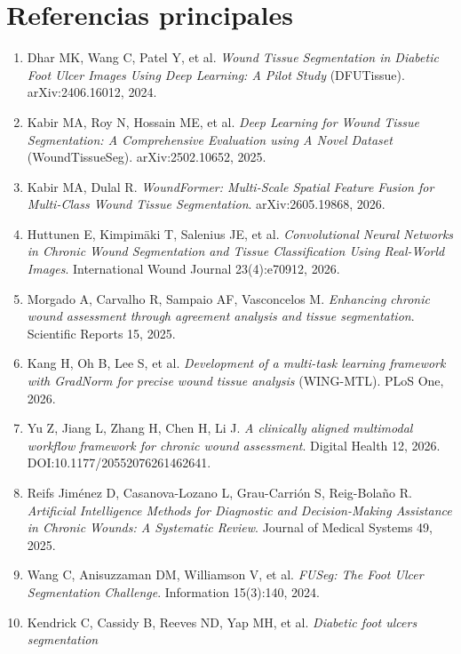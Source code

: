 \documentclass[12pt,letterpaper]{article}
\begin{document}
\section*{Referencias principales}
\small
\begin{enumerate}[leftmargin=1.4em]
  \item Dhar MK, Wang C, Patel Y, et al. \textit{Wound Tissue Segmentation in Diabetic Foot Ulcer
        Images Using Deep Learning: A Pilot Study} (DFUTissue). arXiv:2406.16012, 2024.
  \item Kabir MA, Roy N, Hossain ME, et al. \textit{Deep Learning for Wound Tissue Segmentation: A
        Comprehensive Evaluation using A Novel Dataset} (WoundTissueSeg). arXiv:2502.10652, 2025.
  \item Kabir MA, Dulal R. \textit{WoundFormer: Multi-Scale Spatial Feature Fusion for Multi-Class
        Wound Tissue Segmentation}. arXiv:2605.19868, 2026.
  \item Huttunen E, Kimpimäki T, Salenius JE, et al. \textit{Convolutional Neural Networks in Chronic
        Wound Segmentation and Tissue Classification Using Real-World Images}. International Wound
        Journal 23(4):e70912, 2026.
  \item Morgado A, Carvalho R, Sampaio AF, Vasconcelos M. \textit{Enhancing chronic wound assessment
        through agreement analysis and tissue segmentation}. Scientific Reports 15, 2025.
  \item Kang H, Oh B, Lee S, et al. \textit{Development of a multi-task learning framework with
        GradNorm for precise wound tissue analysis} (WING-MTL). PLoS One, 2026.
  \item Yu Z, Jiang L, Zhang H, Chen H, Li J. \textit{A clinically aligned multimodal workflow
        framework for chronic wound assessment}. Digital Health 12, 2026.
        DOI:10.1177/20552076261462641.
  \item Reifs Jiménez D, Casanova-Lozano L, Grau-Carrión S, Reig-Bolaño R. \textit{Artificial
        Intelligence Methods for Diagnostic and Decision-Making Assistance in Chronic Wounds: A
        Systematic Review}. Journal of Medical Systems 49, 2025.
  \item Wang C, Anisuzzaman DM, Williamson V, et al. \textit{FUSeg: The Foot Ulcer Segmentation
        Challenge}. Information 15(3):140, 2024.
  \item Kendrick C, Cassidy B, Reeves ND, Yap MH, et al. \textit{Diabetic foot ulcers segmentation
}
\end{enumerate}
\end{document}

